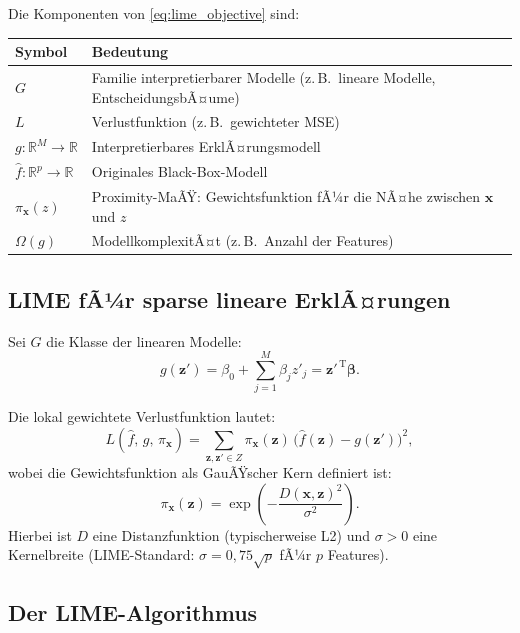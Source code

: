 ﻿\documentclass[a4paper,12pt]{article}
\theoremstyle{definition}
\begin{document}
Die Komponenten von \eqref{eq:lime_objective} sind:

\begin{center}
\begin{tabular}{@{}lp{10cm}@{}}
  \toprule
  Symbol & Bedeutung \\
  \midrule
  $G$ & Familie interpretierbarer Modelle (z.\,B.\ lineare Modelle, EntscheidungsbÃ¤ume) \\
  $L$ & Verlustfunktion (z.\,B.\ gewichteter MSE) \\
  $g: \mathbb{R}^M \to \mathbb{R}$ & Interpretierbares ErklÃ¤rungsmodell \\
  $\hat{f}: \mathbb{R}^p \to \mathbb{R}$ & Originales Black-Box-Modell \\
  $\pi_\mathbf{x}(z)$ & Proximity-MaÃŸ: Gewichtsfunktion fÃ¼r die NÃ¤he zwischen $\mathbf{x}$ und $z$ \\
  $\Omega(g)$ & ModellkomplexitÃ¤t (z.\,B.\ Anzahl der Features) \\
  \bottomrule
\end{tabular}
\end{center}

\subsection{LIME fÃ¼r sparse lineare ErklÃ¤rungen}

Sei $G$ die Klasse der linearen Modelle:
\begin{equation}
  g(\mathbf{z}') = \beta_0 + \sum_{j=1}^{M} \beta_j z'_j = \mathbf{z}'^{\,\mathrm{T}} \boldsymbol{\beta}.
\end{equation}

Die lokal gewichtete Verlustfunktion lautet:
\begin{equation}
  L\!\left(\hat{f},\, g,\, \pi_\mathbf{x}\right)
  = \sum_{\mathbf{z},\mathbf{z}' \in Z}
    \pi_\mathbf{x}(\mathbf{z})\,\bigl(\hat{f}(\mathbf{z}) - g(\mathbf{z}')\bigr)^2,
  \label{eq:lime_loss}
\end{equation}
wobei die Gewichtsfunktion als GauÃŸscher Kern definiert ist:
\begin{equation}
  \pi_\mathbf{x}(\mathbf{z})
  = \exp\!\left(-\frac{D(\mathbf{x}, \mathbf{z})^2}{\sigma^2}\right).
  \label{eq:lime_kernel}
\end{equation}
Hierbei ist $D$ eine Distanzfunktion (typischerweise L2) und $\sigma > 0$ eine
Kernelbreite (LIME-Standard: $\sigma = 0{,}75\sqrt{p}$ fÃ¼r $p$ Features).

\subsection{Der LIME-Algorithmus}
\end{document}
